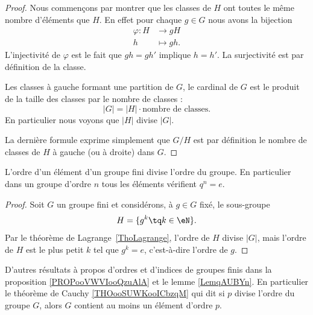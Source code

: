 \begin{proof}
    Nous commençons par montrer que les classes de \( H\) ont toutes le même nombre d'éléments que \( H\). En effet pour chaque \( g\in G\) nous avons la bijection
    \begin{equation}
        \begin{aligned}
            \varphi\colon H&\to gH \\
            h&\mapsto gh.
        \end{aligned}
    \end{equation}
    L'injectivité de \( \varphi\) est le fait que \( gh=gh'\) implique \( h=h'\). La surjectivité est par définition de la classe.

    Les classes à gauche formant une partition de \( G\), le cardinal de \( G\) est le produit de la taille des classes par le nombre de classes :
    \begin{equation}
        | G |=| H |\cdot\text{nombre de classes}.
    \end{equation}
    En particulier nous voyons que \( | H |\) divise \( | G |\).

    La dernière formule exprime simplement que \( G/H\) est par définition le nombre de classes de \( H\) à gauche (ou à droite) dans \( G\).
\end{proof}

\begin{corollary}       \label{CorpZItFX}
    L'ordre d'un élément d'un groupe fini divise l'ordre du groupe. En particulier dans un groupe d'ordre \( n\) tous les éléments vérifient \( q^n=e\).
\end{corollary}

\begin{proof}
    Soit \( G\) un groupe fini et considérons, à \( g \in G \) fixé, le sous-groupe
    \begin{equation}
        H=\{ g^k\tq k\in\eN \}.
    \end{equation}
    Par le théorème de Lagrange~\ref{ThoLagrange}, l'ordre de \( H\) divise \( | G |\), mais l'ordre de \( H\) est le plus petit \( k\) tel que \( g^k=e\), c'est-à-dire l'ordre de \( g\).
\end{proof}

D'autres résultats à propos d'ordres et d'indices de groupes finis dans la proposition \ref{PROPooVWVIooQzuAlA} et le lemme \ref{LemqAUBYn}. En particulier le théorème de Cauchy \ref{THOooSUWKooICbzqM} qui dit si \( p\) divise l'ordre du groupe \( G\), alors \( G\) contient au moins un élément d'ordre \( p\).


